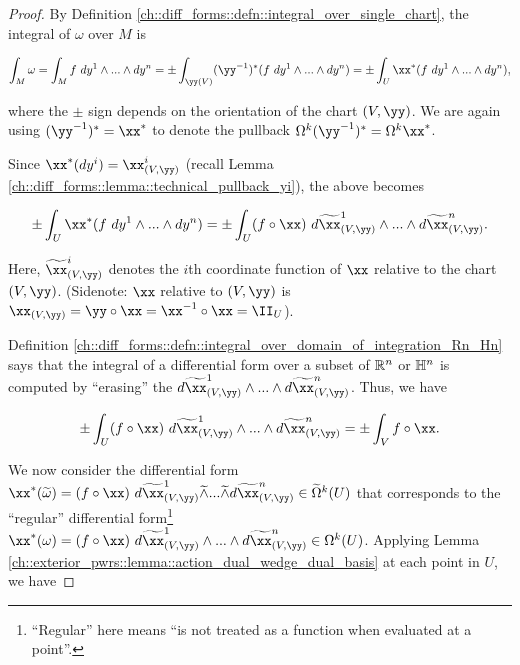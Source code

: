 \begin{proof}
    By Definition \ref{ch::diff_forms::defn::integral_over_single_chart}, the integral of $\omega$ over $M$ is

    \begin{align*}
        \int_M \omega = \int_M f \spc dy^1 \wedge ... \wedge dy^n = \pm \int_{\yy(V)} (\yy^{-1})^*(f \spc dy^1 \wedge ... \wedge dy^n) = \pm \int_U \xx^*(f \spc dy^1 \wedge ... \wedge dy^n),
    \end{align*}
    
    where the $\pm$ sign depends on the orientation of the chart $(V, \yy)$. We are again using $(\yy^{-1})^* = \xx^*$ to denote the pullback $\Omega^k (\yy^{-1})^* = \Omega^k \xx^*$.
    
    Since $\xx^*(dy^i) = \xx_{(V, \yy)}^i$ (recall Lemma \ref{ch::diff_forms::lemma::technical_pullback_yi}), the above becomes
    
    \begin{align*}
        \pm \int_U \xx^*(f \spc dy^1 \wedge ... \wedge dy^n) = \pm \int_U (f \circ \xx) \spc d\tx_{(V, \yy)}^1 \wedge ... \wedge d\tx_{(V, \yy)}^n.
    \end{align*}
    
    Here, $\tx_{(V, \yy)}^i$ denotes the $i$th coordinate function of $\xx$ relative to the chart $(V, \yy)$. (Sidenote: $\xx$ relative to $(V, \yy)$ is $\xx_{(V, \yy)} = \yy \circ \xx = \xx^{-1} \circ \xx = \II_U$).
    
    Definition \ref{ch::diff_forms::defn::integral_over_domain_of_integration_Rn_Hn} says that the integral of a differential form over a subset of $\mathbb{R}^n$ or $\mathbb{H}^n$ is computed by ``erasing'' the $d\tx_{(V, \yy)}^1 \wedge ... \wedge d\tx_{(V, \yy)}^n$. Thus, we have
    
    \begin{align*}
        \pm \int_U (f \circ \xx) \spc d\tx_{(V, \yy)}^1 \wedge ... \wedge d\tx_{(V, \yy)}^n = \pm \int_V f \circ \xx.
    \end{align*}

    We now consider the differential form $\xx^*(\tomega) = (f \circ \xx) \spc d\tx_{(V, \yy)}^1 \twedge ... \twedge d\tx_{(V, \yy)}^n \in \tOmega^k(U)$ that corresponds to the ``regular'' differential form\footnote{``Regular'' here means ``is not treated as a function when evaluated at a point''.} $\xx^*(\omega) = (f \circ \xx) \spc d\tx_{(V, \yy)}^1 \wedge ... \wedge d\tx_{(V, \yy)}^n \in \Omega^k(U)$. Applying Lemma \ref{ch::exterior_pwrs::lemma::action_dual_wedge_dual_basis} at each point in $U$, we have
    

\end{proof}
